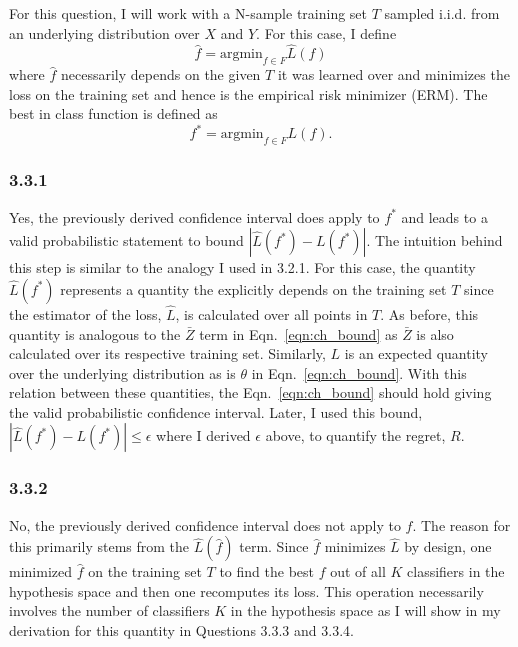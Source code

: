 \documentclass[12pt]{amsart}
\begin{document}
For this question, I will work with a N-sample training set $T$ sampled i.i.d. from an underlying distribution over $X$ and $Y$.  For this case, I define 
\begin{equation} \label{eqn:fhat}
\hat{f} = \text{argmin}_{f \in F}\hat{L}(f)
\end{equation}
where $\hat{f}$ necessarily depends on the given $T$ it was learned over and minimizes the loss on the training set and hence is the empirical risk minimizer (ERM).  The best in class function is defined as
\begin{equation} \label{eqn:fstar}
f^* = \text{argmin}_{f \in F}L(f).
\end{equation}

\subsubsection*{3.3.1}

Yes, the previously derived confidence interval does apply to $f^*$ and leads to a valid probabilistic statement to bound $|\hat{L}(f^*) - L(f^*)|$.  The intuition behind this step is similar to the analogy I used in 3.2.1.  For this case, the quantity $\hat{L}(f^*)$ represents a quantity the explicitly depends on the training set $T$ since the estimator of the loss, $\hat{L}$, is calculated over all points in $T$.  As before, this quantity is analogous to the $\bar{Z}$ term in Eqn.~\ref{eqn:ch_bound} as $\bar{Z}$ is also calculated over its respective training set.  Similarly, $L$ is an expected quantity over the underlying distribution as is $\theta$ in Eqn.~\ref{eqn:ch_bound}.  With this relation between these quantities, the Eqn.~\ref{eqn:ch_bound} should hold giving the valid probabilistic confidence interval.  Later, I used this bound, $|\hat{L}(f^*) - L(f^*)| \leq \epsilon$ where I derived $\epsilon$ above, to quantify the regret, $R$. 

\subsubsection*{3.3.2}

No, the previously derived confidence interval does not apply to $\hat{f}$.  The reason for this primarily stems from the $\hat{L}(\hat{f})$ term.  Since $\hat{f}$ minimizes $\hat{L}$ by design, one minimized $\hat{f}$ on the training set $T$ to find the best $f$ out of all $K$ classifiers in the hypothesis space and then one recomputes its loss.  This operation necessarily involves the number of classifiers $K$ in the hypothesis space as I will show in my derivation for this quantity in Questions 3.3.3 and 3.3.4.
\end{document}
